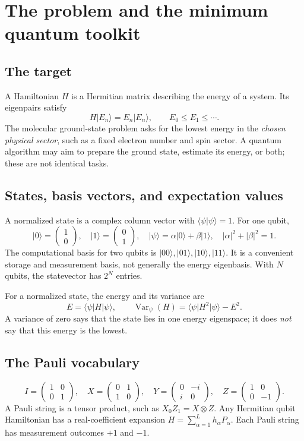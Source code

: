 \documentclass[11pt,a4paper]{article}
\newcommand{\ket}[1]{\lvert #1\rangle}
\newcommand{\bra}[1]{\langle #1\rvert}
\newcommand{\braket}[2]{\langle #1\vert #2\rangle}
\newcommand{\Var}{\operatorname{Var}}
\newcommand{\lesson}[2]{\clearpage\section{#1}\label{#2}}
\begin{document}
\clearpage
\tableofcontents

\lesson{The problem and the minimum quantum toolkit}{sec:toolkit}
\subsection*{The target}
A Hamiltonian $H$ is a Hermitian matrix describing the energy of a system. Its eigenpairs satisfy
\[
H\ket{E_n}=E_n\ket{E_n},\qquad E_0\le E_1\le\cdots.
\]
The molecular ground-state problem asks for the lowest energy in the \emph{chosen physical sector}, such as a fixed electron number and spin sector. A quantum algorithm may aim to prepare the ground state, estimate its energy, or both; these are not identical tasks.

\subsection*{States, basis vectors, and expectation values}
A normalized state is a complex column vector with $\braket{\psi}{\psi}=1$. For one qubit,
\[
\ket{0}=\begin{pmatrix}1\\0\end{pmatrix},\quad
\ket{1}=\begin{pmatrix}0\\1\end{pmatrix},\quad
\ket{\psi}=\alpha\ket{0}+\beta\ket{1},\quad
|\alpha|^2+|\beta|^2=1.
\]
The computational basis for two qubits is $\ket{00},\ket{01},\ket{10},\ket{11}$. It is a convenient storage and measurement basis, not generally the energy eigenbasis. With $N$ qubits, the statevector has $2^N$ entries.

For a normalized state, the energy and its variance are
\[
E=\bra{\psi}H\ket{\psi},\qquad
\Var_\psi(H)=\bra{\psi}H^2\ket{\psi}-E^2.
\]
A variance of zero says that the state lies in one energy eigenspace; it does \emph{not} say that this energy is the lowest.

\subsection*{The Pauli vocabulary}
\[
I=\begin{pmatrix}1&0\\0&1\end{pmatrix},\quad
X=\begin{pmatrix}0&1\\1&0\end{pmatrix},\quad
Y=\begin{pmatrix}0&-i\\i&0\end{pmatrix},\quad
Z=\begin{pmatrix}1&0\\0&-1\end{pmatrix}.
\]
A Pauli string is a tensor product, such as $X_0Z_1=X\otimes Z$. Any Hermitian qubit Hamiltonian has a real-coefficient expansion $H=\sum_{\alpha=1}^{L}h_\alpha P_\alpha$. Each Pauli string has measurement outcomes $+1$ and $-1$.
\end{document}

